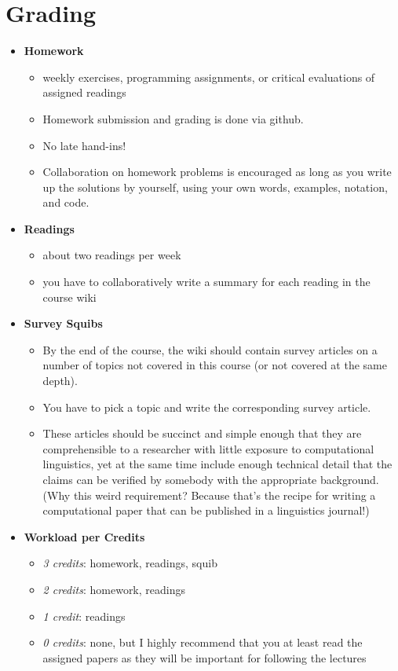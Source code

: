 \section{Grading}
\begin{itemize}
    \item \textbf{Homework}
        \begin{itemize}
            \item weekly exercises, programming assignments, or critical evaluations of assigned readings
            \item Homework submission and grading is done via github.
            \item No late hand-ins!
            \item Collaboration on homework problems is encouraged as long as you write up the solutions by yourself, using your own words, examples, notation, and code.
        \end{itemize}
    \item \textbf{Readings}
        \begin{itemize}
            \item about two readings per week
            \item you have to collaboratively write a summary for each reading in the course wiki
        \end{itemize}
    \item \textbf{Survey Squibs}
        \begin{itemize}
            \item By the end of the course, the wiki should contain survey articles on a number of topics not covered in this course (or not covered at the same depth).
            \item You have to pick a topic and write the corresponding survey article.
            \item These articles should be succinct and simple enough that they are comprehensible to a researcher with little exposure to computational linguistics, yet at the same time include enough technical detail that the claims can be verified by somebody with the appropriate background.
                (Why this weird requirement?
                Because that's the recipe for writing a computational paper that can be published in a linguistics journal!)
        \end{itemize}
    \item \textbf{Workload per Credits}
        \begin{itemize}
            \item \emph{3 credits}: homework, readings, squib
            \item \emph{2 credits}: homework, readings
            \item \emph{1 credit}: readings
            \item \emph{0 credits}: none, but I highly recommend that you at least read the assigned papers as they will be important for following the lectures
        \end{itemize}
\end{itemize}


